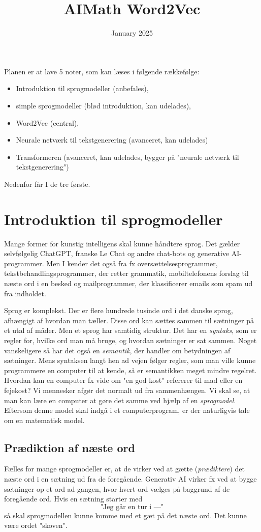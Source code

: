 \documentclass{article}
\title{AIMath Word2Vec}
\author{}
\date{January 2025}
\newcommand{\am}[1]{{\color{red} #1}}
\begin{document}
\am{Planen er at lave 5 noter, som kan læses i følgende rækkefølge: 
\begin{itemize}
\item Introduktion til sprogmodeller (anbefales), 
\item simple sprogmodeller (blød introduktion, kan udelades), 
\item Word2Vec (central), 
\item Neurale netværk til tekstgenerering (avanceret, kan udelades)
\item Transformeren (avanceret, kan udelades, bygger på "neurale netværk til tekstgenerering")
\end{itemize}
Nedenfor får I de tre første.}

\section{Introduktion til sprogmodeller}

Mange former for kunstig intelligens skal kunne håndtere sprog. Det gælder selvfølgelig ChatGPT, franske Le Chat og andre chat-bots og generative AI-programmer. Men I kender det også fra fx oversættelsesprogrammer, tekstbehandlingsprogrammer, der retter grammatik, mobiltelefonens forslag til næste ord i en besked og mailprogrammer, der klassificerer emails som spam ud fra indholdet. 

 Sprog er komplekst. Der er flere hundrede tusinde ord i det danske sprog, afhængigt af hvordan man tæller. Disse ord kan sættes sammen til sætninger på et utal af måder. Men et sprog har samtidig struktur. Det har en \emph{syntaks}, som er regler for, hvilke ord man må bruge, og hvordan sætninger er sat sammen. Noget vanskeligere så har det også en \emph{semantik}, der handler om betydningen af sætninger. Mens syntaksen langt hen ad vejen følger regler, som man ville kunne programmere en computer til at kende, så er semantikken meget mindre regelret. 
Hvordan kan en computer fx vide om "en god kost" refererer til mad eller en fejekost? Vi mennesker afgør det normalt ud fra sammenhængen. 
Vi skal se, at man kan lære en computer at gøre det samme ved hjælp af en \emph{sprogmodel}. Eftersom denne model skal indgå i et computerprogram, er der naturligvis tale om en matematisk model. 

\subsection*{Prædiktion af næste ord}
Fælles for mange sprogmodeller er, at de virker ved at gætte (\emph{prædiktere}) det næste ord i en sætning ud fra de foregående. Generativ AI virker fx ved at bygge sætninger op et ord ad gangen, hvor hvert ord vælges på baggrund af de foregående ord. Hvis en sætning starter med 
$$\text{"Jeg går en tur i ---"}$$
så skal sprogmodellen kunne komme med et gæt på det  næste ord. Det kunne være ordet "skoven". 
\end{document}
